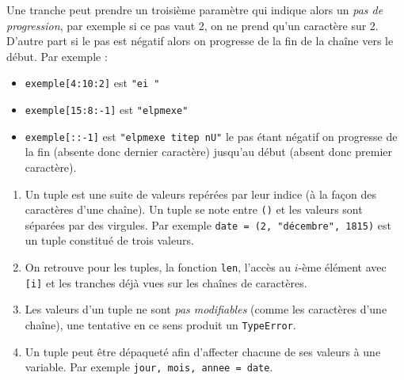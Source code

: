 \documentclass[11pt,a4paper]{article}
\begin{document}
\begin{tcolorbox}[left=0cm,title=\bf{\faPython \; Tranches},colbacktitle=cfond]
\begin{enumerate}
	Une tranche peut prendre un troisième paramètre qui indique alors un \textit{pas de progression}, par exemple si ce pas vaut 2, on ne prend qu'un caractère sur 2. D'autre part si le pas est négatif alors on progresse de la fin de la chaîne vers le début. Par exemple :
	\begin{itemize}
		\item[\textbullet] \texttt{exemple[4:10:2]} est {\tt "ei "}
		\item[\textbullet] \texttt{exemple[15:8:-1]} est {\tt "elpmexe"} 
		\item[\textbullet] \texttt{exemple[::-1]} est {\tt "elpmexe titep nU"} le pas étant négatif on progresse de la fin (absente donc dernier caractère) jusqu'au début (absent donc premier caractère).
	\end{itemize}	
	\end{enumerate}
	\end{tcolorbox}
	
	\begin{tcolorbox}[left=0cm,title=\bf{\faPython \; Tuples},colbacktitle=cfond]
		\begin{enumerate}
			\item[\ding{182}] Un tuple est une suite de valeurs repérées par leur indice (à la façon des caractères d'une chaîne). Un tuple se note entre {\tt ()} et les valeurs sont séparées par des virgules. Par exemple \texttt{date = (2, "décembre", 1815)} est un tuple constitué de trois valeurs.
			\item[\ding{183}] On retrouve pour les tuples, la fonction {\tt len}, l'accès au $i$-ème élément avec {\tt [i]} et les tranches déjà vues sur les chaînes de caractères.
			\item[\ding{184}] Les valeurs d'un tuple ne sont \textit{pas modifiables} (comme les caractères d'une chaîne), une tentative en ce sens produit un {\tt TypeError}.
			\item[\ding{185}] Un tuple peut être dépaqueté afin d'affecter chacune de ses valeurs à une variable. Par exemple \texttt{jour, mois, annee = date}.
		\end{enumerate}
	\end{tcolorbox}
	
\end{document}
